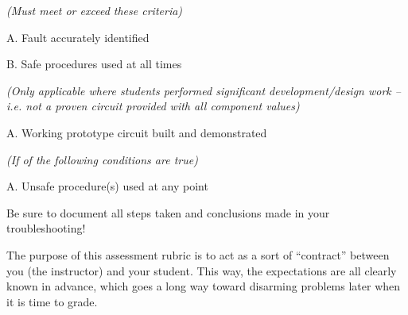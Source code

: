 \noindent
{} {\it (Must meet or exceed these criteria)}
\item{A.} Fault accurately identified
\item{B.} Safe procedures used at all times
\bigskip


\noindent
{} {\it (Only applicable where students performed significant development/design work -- i.e. not a proven circuit provided with all component values)}
\item{A.} Working prototype circuit built and demonstrated
\bigskip


\noindent
{} {\it (If  of the following conditions are true)}
\item{A.} Unsafe procedure(s) used at any point
\bigskip









Be sure to document all steps taken and conclusions made in your troubleshooting!







The purpose of this assessment rubric is to act as a sort of ``contract'' between you (the instructor) and your student.  This way, the expectations are all clearly known in advance, which goes a long way toward disarming problems later when it is time to grade.




